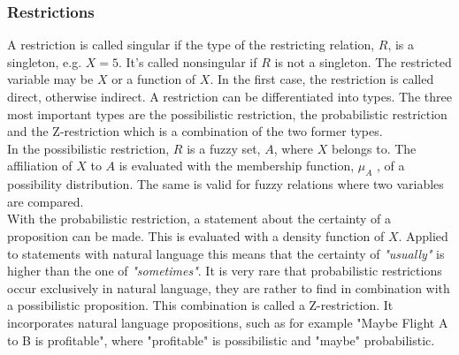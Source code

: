 \documentclass[conference]{IEEEtran}
\begin{document}
\subsubsection{Restrictions}
\label{subsubsec:restrictions}
A restriction is called singular if the type of the restricting relation, \begin{math} R \end{math}, is a singleton, e.g. \begin{math} X=5 \end{math}. It’s called nonsingular if \begin{math} R \end{math} is not a singleton. The restricted variable may be \begin{math} X \end{math} or a function of \begin{math} X \end{math}. In the first case, the restriction is called direct, otherwise indirect. A restriction can be differentiated into types. The three most important types are the possibilistic restriction, the probabilistic restriction and the Z-restriction which is a combination of the two former types.\\
In the possibilistic restriction, \begin{math} R \end{math} is a fuzzy set, \begin{math} A \end{math}, where \begin{math} X \end{math} belongs to. The affiliation of \begin{math} X \end{math} to \begin{math} A \end{math} is evaluated with the membership function, \begin{math} \mu_{A} \end{math} , of a possibility distribution. The same is valid for fuzzy relations where two variables are compared.\\
With the probabilistic restriction, a statement about the certainty of a proposition can be made. This is evaluated with a density function of \begin{math} X \end{math}. Applied to statements with natural language this means that the certainty of \emph{"usually"} is higher than the one of \emph{"sometimes"}. It is very rare that probabilistic restrictions occur exclusively in natural language, they are rather to find in combination with a possibilistic proposition. This combination is called a Z-restriction. \cite{zadeh2013} It incorporates natural language propositions, such as for example "Maybe Flight A to B is profitable", where "profitable" is possibilistic and "maybe" probabilistic.\\
\end{document}
